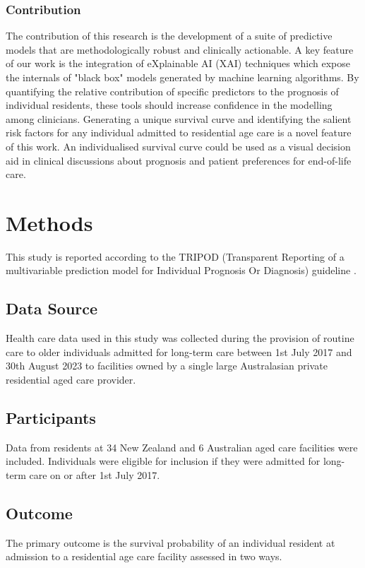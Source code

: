 \documentclass{article}
\begin{document}
\subsubsection*{Contribution}
The contribution of this research is the development of a suite of predictive models that are methodologically robust and clinically actionable.  A key feature of our work is the integration of eXplainable AI (XAI) techniques which expose the internals of "black box" models generated by machine learning algorithms.  By quantifying the relative contribution of specific predictors to the prognosis of individual residents, these tools should increase confidence in the modelling among clinicians.  Generating a unique survival curve and identifying the salient risk factors for any individual admitted to residential age care is a novel feature of this work. An individualised survival curve could be used as a visual decision aid in clinical discussions about prognosis and patient preferences for end-of-life care.

\section{Methods}

This study is reported according to the TRIPOD (Transparent Reporting of a multivariable prediction model for Individual Prognosis Or Diagnosis) guideline \cite{collins2015transparent}.

\subsection{Data Source}
Health care data used in this study was  collected during the provision of routine care to older individuals admitted for long-term care between 1st July 2017 and 30th August 2023 to facilities owned by a single large Australasian private residential aged care provider.

\subsection{Participants}
Data from residents at 34 New Zealand and 6 Australian aged care facilities were included. Individuals were eligible for inclusion if they were admitted for long-term care on or after 1st July 2017.

\subsection{Outcome}
The primary outcome is the survival probability of an individual resident at admission to a residential age care facility assessed in two ways.
\end{document}
